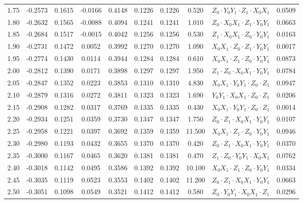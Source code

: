 \begin{tabular}{c|c|c|c|c|c|c|c|c|c}
1.75 & -0.2573 & 0.1615 & -0.0166 & 0.4148 & 0.1226 & 0.1226 & 0.520 & $Z_0 \cdot Y_0 Y_1 \cdot Z_1 \cdot X_0 X_1$ & 0.0509 \\
1.80 & -0.2632 & 0.1565 & -0.0088 & 0.4094 & 0.1241 & 0.1241 & 1.010 & $Z_0 \cdot X_0 X_1 \cdot Z_1 \cdot Y_0 Y_1$ & 0.0663 \\
1.85 & -0.2684 & 0.1517 & -0.0015 & 0.4042 & 0.1256 & 0.1256 & 0.530 & $Z_1 \cdot X_0 X_1 \cdot Z_0 \cdot Y_0 Y_1$ & 0.0163 \\
1.90 & -0.2731 & 0.1472 & 0.0052 & 0.3992 & 0.1270 & 0.1270 & 1.090 & $X_0 X_1 \cdot Z_0 \cdot Z_1 \cdot Y_0 Y_1$ & 0.0017 \\
1.95 & -0.2774 & 0.1430 & 0.0114 & 0.3944 & 0.1284 & 0.1284 & 0.610 & $X_0 X_1 \cdot Z_1 \cdot Z_0 \cdot Y_0 Y_1$ & 0.0873 \\
2.00 & -0.2812 & 0.1390 & 0.0171 & 0.3898 & 0.1297 & 0.1297 & 1.950 & $Z_1 \cdot Z_0 \cdot X_0 X_1 \cdot Y_0 Y_1$ & 0.0784 \\
2.05 & -0.2847 & 0.1352 & 0.0223 & 0.3853 & 0.1310 & 0.1310 & 4.830 & $X_0 X_1 \cdot Y_0 Y_1 \cdot Z_0 \cdot Z_1$ & 0.0947 \\
2.10 & -0.2879 & 0.1316 & 0.0272 & 0.3811 & 0.1323 & 0.1323 & 1.690 & $Y_0 Y_1 \cdot X_0 X_1 \cdot Z_0 \cdot Z_1$ & 0.0206 \\
2.15 & -0.2908 & 0.1282 & 0.0317 & 0.3769 & 0.1335 & 0.1335 & 0.430 & $X_0 X_1 \cdot Y_0 Y_1 \cdot Z_0 \cdot Z_1$ & 0.0014 \\
2.20 & -0.2934 & 0.1251 & 0.0359 & 0.3730 & 0.1347 & 0.1347 & 1.750 & $Z_0 \cdot Z_1 \cdot X_0 X_1 \cdot Y_0 Y_1$ & 0.0107 \\
2.25 & -0.2958 & 0.1221 & 0.0397 & 0.3692 & 0.1359 & 0.1359 & 11.500 & $X_0 X_1 \cdot Z_1 \cdot Z_0 \cdot Y_0 Y_1$ & 0.0946 \\
2.30 & -0.2980 & 0.1193 & 0.0432 & 0.3655 & 0.1370 & 0.1370 & 0.420 & $Z_0 \cdot Z_1 \cdot X_0 X_1 \cdot Y_0 Y_1$ & 0.0370 \\
2.35 & -0.3000 & 0.1167 & 0.0465 & 0.3620 & 0.1381 & 0.1381 & 0.470 & $Z_1 \cdot Z_0 \cdot Y_0 Y_1 \cdot X_0 X_1$ & 0.0762 \\
2.40 & -0.3018 & 0.1142 & 0.0495 & 0.3586 & 0.1392 & 0.1392 & 10.100 & $X_0 X_1 \cdot Z_1 \cdot Z_0 \cdot Y_0 Y_1$ & 0.0334 \\
2.45 & -0.3035 & 0.1119 & 0.0523 & 0.3553 & 0.1402 & 0.1402 & 11.200 & $Z_0 \cdot Z_1 \cdot X_0 X_1 \cdot Y_0 Y_1$ & 0.0663 \\
2.50 & -0.3051 & 0.1098 & 0.0549 & 0.3521 & 0.1412 & 0.1412 & 0.580 & $Z_0 \cdot Y_0 Y_1 \cdot X_0 X_1 \cdot Z_1$ & 0.0296 \\

\end{tabular}
